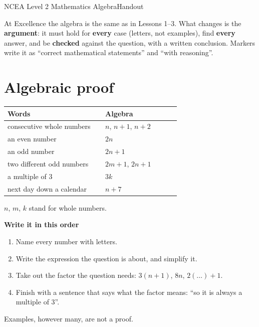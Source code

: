 \documentclass[11pt]{article}
\begin{document}
  {NCEA Level 2 Mathematics \textperiodcentered{} Algebra}{Handout}

\begin{keybox}[title={The one idea: general, complete, checked}]
At Excellence the algebra is the same as in Lessons 1--3. What changes is the \textbf{argument}: it must hold for \textbf{every} case (letters, not examples), find \textbf{every} answer, and be \textbf{checked} against the question, with a written conclusion. Markers write it as ``correct mathematical statements'' and ``with reasoning''.
\end{keybox}

\section{Algebraic proof}\label{h4:proof}
\begin{minipage}[t]{0.46\textwidth}\vspace{0pt}
\renewcommand\arraystretch{1.4}
\begin{tabular}{@{}>{\raggedright}p{0.52\linewidth} >{\raggedright\arraybackslash}p{0.4\linewidth}@{}}
\toprule
\textbf{Words} & \textbf{Algebra}\\ \midrule
consecutive whole numbers & $n$, $n+1$, $n+2$ \\
an even number & $2n$ \\
an odd number & $2n+1$ \\
two different odd numbers & $2m+1$, $2n+1$ \\
a multiple of 3 & $3k$ \\
next day down a calendar & $n+7$ \\
\bottomrule
\end{tabular}\par\smallskip
$n$, $m$, $k$ stand for whole numbers.
\end{minipage}\hfill
\begin{minipage}[t]{0.5\textwidth}\vspace{0pt}
\textbf{Write it in this order}
\begin{enumerate}
\item Name every number with letters.
\item Write the expression the question is about, and simplify it.
\item Take out the factor the question needs: $3(n+1)$, $8n$, $2(\ldots) + 1$.
\item Finish with a sentence that says what the factor means: ``so it is always a multiple of 3''.
\end{enumerate}
Examples, however many, are not a proof.
\end{minipage}
\end{document}
